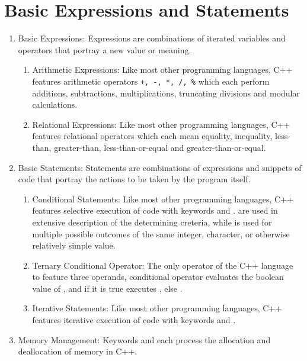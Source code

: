 \section{Basic Expressions and Statements}
\begin{enumerate}
\item Basic Expressions: Expressions are combinations of iterated variables
    and operators that portray a new value or meaning.
    \begin{enumerate}
    \item Arithmetic Expressions: Like most other programming languages, C++
        features arithmetic operators \verb|+, -, *, /, %| which each perform
        additions, subtractions, multiplications, truncating divisions and
        modular calculations. 
    \item Relational Expressions: Like most other programming languages, C++
        features relational operators \imc{==, !=, <, >, <=, >=} which each mean
        equality, inequality, less-than, greater-than, less-than-or-equal and
        greater-than-or-equal. 
    \end{enumerate}
\item Basic Statements: Statements are combinations of expressions and snippets
    of code that portray the actions to be taken by the program itself.
    \begin{enumerate}
    \item Conditional Statements: Like most other programming languages, C++
        features selective execution of code with keywords  and
        .  are used in extensive description of the
        determining creteria, while  is used for multiple possible
        outcomes of the same integer, character, or otherwise relatively simple
        value. 
\newpage
    \item Ternary Conditional Operator: The only operator of the C++ language to
        feature three operands, conditional operator 
        evaluates the boolean value of , and if it is true executes
            , else . 
    \item Iterative Statements: Like most other programming languages, C++
        features iterative execution of code with keywords  and
        . 
    \end{enumerate}
\item Memory Management: Keywords  and  each process the
    allocation and deallocation of memory in C++.
\end{enumerate}
